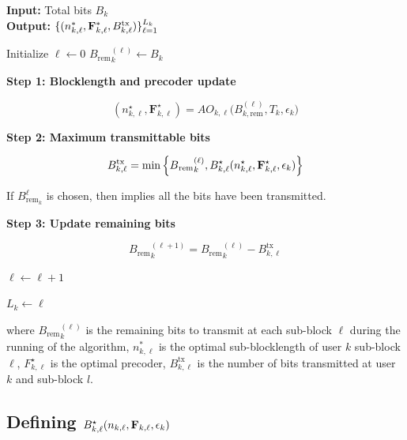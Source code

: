 \documentclass[a4paper, 12pt, onecolumn, journal, twoside, draftclsnofoot]{IEEEtran}
\begin{document}
\begin{algorithm}[H]
\caption{Greedy Allocation of Bits for User $k$}
\textbf{Input:} Total bits $B_k$ \\
\textbf{Output:} $\{(n^*_{k,\ell},{\bf F}^*_{k,\ell},B^{\text{tx}}_{k,\ell})\}_{\ell=1}^{L_k}$
\begin{algorithmic}[1]

\State Initialize $\ell \gets 0$
\State $B{_\text{rem}}^{(\ell)}_k \gets B_k$


\State \textbf{Step 1: Blocklength and precoder update}

\begin{equation*}
(n^\star_{k,\ell},\mathbf{F}^\star_{k,\ell})
=
AO_{k,\ell}\big(B^{(\ell)}_{k,\text{rem}}, T_k, \epsilon_k \big)
\end{equation*}


\State \textbf{Step 2: Maximum transmittable bits}

\begin{equation*}
B^{\text{tx}}_{k,\ell}
=
\min
\Big\{
B{_\text{rem}}^{(\ell)}_k,
B^\star_{k,\ell}(n^\star_{k,\ell},{\bf F}^\star_{k,\ell}, \epsilon_k)
\Big\}
\end{equation*}

If $B_{\text{rem}_k}^\ell$ is chosen, then implies all the bits have been transmitted.

\State \textbf{Step 3: Update remaining bits}

\begin{equation*}
B{_\text{rem}}^{(\ell+1)}_k = B{_\text{rem}}^{(\ell)}_k - B^{\text{tx}}_{k,\ell}
\end{equation*}

\State $\ell \gets \ell + 1$

\EndWhile

\State $L_k \gets \ell$

\end{algorithmic}
\end{algorithm}

where $B{_\text{rem}}^{(\ell)}_k$ is the remaining bits to transmit at each sub-block $\ell$ during the running of the algorithm,  $n^*_{k, \ell}$ is the optimal sub-blocklength of user $k$ sub-block $\ell$, $F^\star_{k, \ell}$ is the optimal precoder, $B^{\text{tx}}_{k, \ell}$ is the number of bits transmitted at user $k$ and sub-block $l$.


\subsection{Defining $B^\star_{k,\ell}(n_{k,\ell}, {\bf F}_{k, \ell}, \epsilon_k)$}
\end{document}

